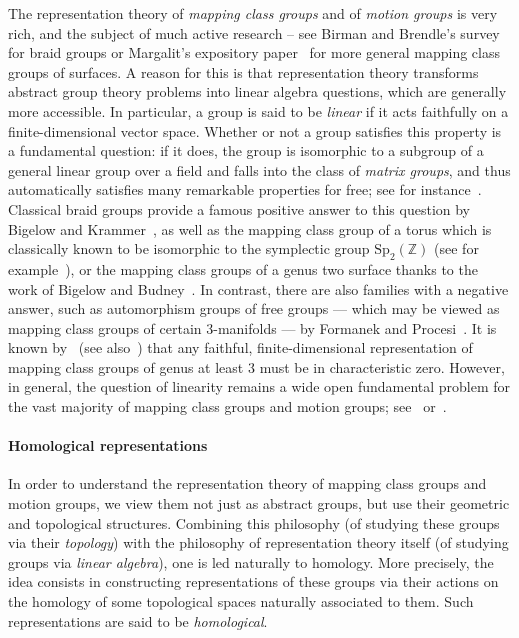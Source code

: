 \documentclass[AHL,Unicode,published]{cedram}
\newcommand{\Sp}{\mathrm{Sp}}
\newcommand{\bZ}{\mathbb{Z}}
\newcommand*{\MK}{\mkern 2mu}
\begin{document}
The representation theory of \emph{mapping class groups} and of \emph{motion groups} is very rich, and the subject of much active research -- see Birman and Brendle's survey~\cite[\S~4]{BirmanBrendlesurvey} for braid groups or Margalit's expository paper~\cite{Margalit} for more general mapping class groups of surfaces. A reason for this is that representation theory transforms abstract group theory problems into linear algebra questions, which are generally more accessible. In particular, a group is said to be \emph{linear} if it acts faithfully on a finite-dimensional vector space. Whether or not a group satisfies this property is a fundamental question: if it does, the group is isomorphic to a subgroup of a general linear group over a field and falls into the class of \emph{matrix groups}, and thus automatically satisfies many remarkable properties for free; see for instance~\cite{Suprunenko}. Classical braid groups provide a famous positive answer to this question by Bigelow and Krammer~\cite{bigelow2001braid,KrammerLK}, as well as the mapping class group of a torus which is classically known to be isomorphic to the symplectic group $\Sp_{2}(\bZ)$ (see for example~\cite[Th.~2.5]{farbmargalit}), or the mapping class groups of a genus two surface thanks to the work of Bigelow and Budney~\cite{BigelowBudney}. In contrast, there are also families with a negative answer, such as automorphism groups of free groups --- which may be viewed as mapping class groups of certain $3$-manifolds --- by Formanek and Procesi~\cite{FormanekProcesi}. It is known by~\cite{Button2016} (see also~\cite[Cor.~1.4$\MK$(b)]{KoberdaLuoSun2019}) that any faithful, finite-dimensional representation of mapping class groups of genus at least $3$ must be in characteristic zero. However, in general, the question of linearity remains a wide open fundamental problem for the vast majority of mapping class groups and motion groups; see~\cite{BrendleHamidi-Tehrani} or~\cite[\S~1]{Margalit}.


\paragraph*{Homological representations}
In order to understand the representation theory of mapping class groups and motion groups, we view them not just as abstract groups, but use their geometric and topological structures. Combining this philosophy (of studying these groups via their \emph{topology}) with the philosophy of representation theory itself (of studying groups via \emph{linear algebra}), one is led naturally to homology. More precisely, the idea consists in constructing representations of these groups via their actions on the homology of some topological spaces naturally associated to them. Such representations are said to be \emph{homological}.
\end{document}
